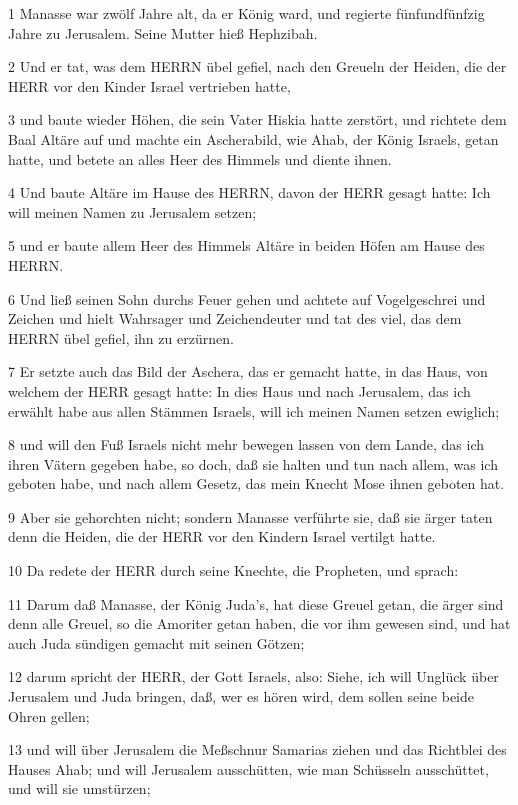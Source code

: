 \par 1 Manasse war zwölf Jahre alt, da er König ward, und regierte fünfundfünfzig Jahre zu Jerusalem. Seine Mutter hieß Hephzibah.
\par 2 Und er tat, was dem HERRN übel gefiel, nach den Greueln der Heiden, die der HERR vor den Kinder Israel vertrieben hatte,
\par 3 und baute wieder Höhen, die sein Vater Hiskia hatte zerstört, und richtete dem Baal Altäre auf und machte ein Ascherabild, wie Ahab, der König Israels, getan hatte, und betete an alles Heer des Himmels und diente ihnen.
\par 4 Und baute Altäre im Hause des HERRN, davon der HERR gesagt hatte: Ich will meinen Namen zu Jerusalem setzen;
\par 5 und er baute allem Heer des Himmels Altäre in beiden Höfen am Hause des HERRN.
\par 6 Und ließ seinen Sohn durchs Feuer gehen und achtete auf Vogelgeschrei und Zeichen und hielt Wahrsager und Zeichendeuter und tat des viel, das dem HERRN übel gefiel, ihn zu erzürnen.
\par 7 Er setzte auch das Bild der Aschera, das er gemacht hatte, in das Haus, von welchem der HERR gesagt hatte: In dies Haus und nach Jerusalem, das ich erwählt habe aus allen Stämmen Israels, will ich meinen Namen setzen ewiglich;
\par 8 und will den Fuß Israels nicht mehr bewegen lassen von dem Lande, das ich ihren Vätern gegeben habe, so doch, daß sie halten und tun nach allem, was ich geboten habe, und nach allem Gesetz, das mein Knecht Mose ihnen geboten hat.
\par 9 Aber sie gehorchten nicht; sondern Manasse verführte sie, daß sie ärger taten denn die Heiden, die der HERR vor den Kindern Israel vertilgt hatte.
\par 10 Da redete der HERR durch seine Knechte, die Propheten, und sprach:
\par 11 Darum daß Manasse, der König Juda's, hat diese Greuel getan, die ärger sind denn alle Greuel, so die Amoriter getan haben, die vor ihm gewesen sind, und hat auch Juda sündigen gemacht mit seinen Götzen;
\par 12 darum spricht der HERR, der Gott Israels, also: Siehe, ich will Unglück über Jerusalem und Juda bringen, daß, wer es hören wird, dem sollen seine beide Ohren gellen;
\par 13 und will über Jerusalem die Meßschnur Samarias ziehen und das Richtblei des Hauses Ahab; und will Jerusalem ausschütten, wie man Schüsseln ausschüttet, und will sie umstürzen;
